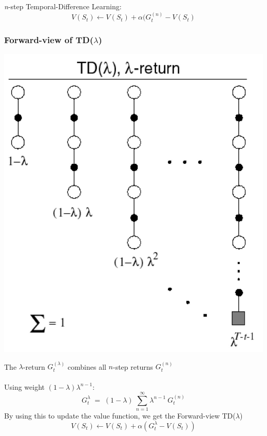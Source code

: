 \documentclass[10pt]{article}
\begin{document}
\textit{n}-step Temporal-Difference Learning:
\begin{equation}
V(S_{t}) \leftarrow V(S_{t}) + \alpha (G_{t}^{(n)} - V(S_{t})
\end{equation}

\subsubsection*{Forward-view of TD($\lambda$)}
\begin{minipage}{0.5\textwidth}
\includegraphics[width=\textwidth]{pictures/lambda_return.jpg}
\end{minipage} \hfill
\begin{minipage}{0.5\textwidth}
The $\lambda$-return $G_{t}^{(\lambda)}$ combines all $n$-step returns $G_{t}^{(n)}$  \\ \\
Using weight $(1-\lambda)\lambda^{n-1}$:
\begin{equation}
G_{t}^{\lambda}\;=\; (1-\lambda)\:\sum_{n=1}^{\infty} \lambda^{n-1} \: G_{t}^{(n)}
\end{equation}
By using this to update the value function, we get the Forward-view TD($\lambda$)
\begin{equation}
V(S_{t}) \leftarrow V(S_{t}) + \alpha (G_{t}^{\lambda} - V(S_{t}))
\end{equation}
\end{minipage}
\end{document}
